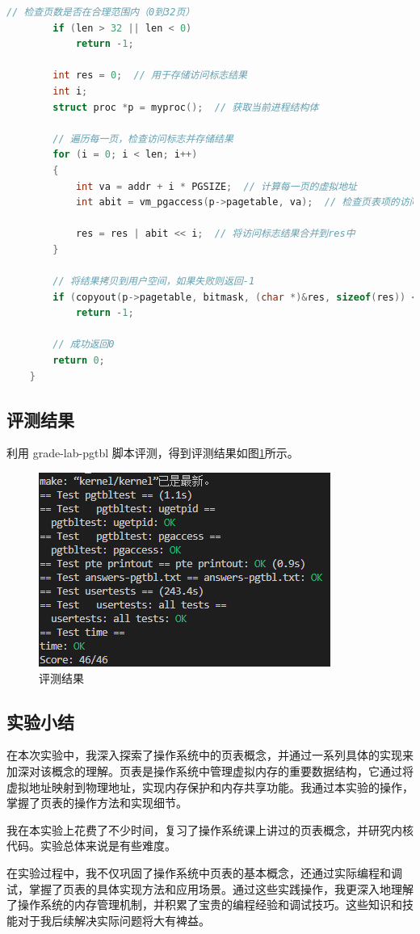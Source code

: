\begin{enumerate}
\begin{lstlisting}[language=c, title=sys\_pgaccess函数的实现]
        // 检查页数是否在合理范围内（0到32页）
        if (len > 32 || len < 0)
            return -1;
    
        int res = 0;  // 用于存储访问标志结果
        int i;
        struct proc *p = myproc();  // 获取当前进程结构体
    
        // 遍历每一页，检查访问标志并存储结果
        for (i = 0; i < len; i++)
        {
            int va = addr + i * PGSIZE;  // 计算每一页的虚拟地址
            int abit = vm_pgaccess(p->pagetable, va);  // 检查页表项的访问标志
        
            res = res | abit << i;  // 将访问标志结果合并到res中
        }
    
        // 将结果拷贝到用户空间，如果失败则返回-1
        if (copyout(p->pagetable, bitmask, (char *)&res, sizeof(res)) < 0)
            return -1;
    
        // 成功返回0
        return 0;
    }      
    \end{lstlisting}
\end{enumerate}

\subsection{评测结果}
利用 grade-lab-pgtbl 脚本评测，得到评测结果如图\ref{fig:pgtbl}所示。
\begin{figure}[h]
    \centering
    \includegraphics[width=\linewidth]{pics/pagetable评测结果.png}
    \caption{评测结果}
    \label{fig:pgtbl}
\end{figure}

\subsection{实验小结}
在本次实验中，我深入探索了操作系统中的页表概念，并通过一系列具体的实现来加深对该概念的理解。页表是操作系统中管理虚拟内存的重要数据结构，它通过将虚拟地址映射到物理地址，实现内存保护和内存共享功能。我通过本实验的操作，掌握了页表的操作方法和实现细节。

我在本实验上花费了不少时间，复习了操作系统课上讲过的页表概念，并研究内核代码。实验总体来说是有些难度。

在实验过程中，我不仅巩固了操作系统中页表的基本概念，还通过实际编程和调试，掌握了页表的具体实现方法和应用场景。通过这些实践操作，我更深入地理解了操作系统的内存管理机制，并积累了宝贵的编程经验和调试技巧。这些知识和技能对于我后续解决实际问题将大有裨益。
